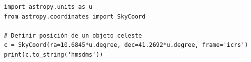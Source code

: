 \documentclass{beamer}
\begin{document}
\begin{frame}[fragile]
\begin{verbatim}
import astropy.units as u
from astropy.coordinates import SkyCoord

# Definir posición de un objeto celeste
c = SkyCoord(ra=10.6845*u.degree, dec=41.2692*u.degree, frame='icrs')
print(c.to_string('hmsdms'))
\end{verbatim}
\end{frame}
\end{document}
